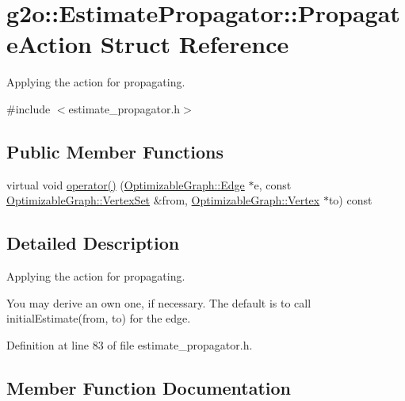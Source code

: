 \hypertarget{structg2o_1_1EstimatePropagator_1_1PropagateAction}{}\section{g2o\+:\+:Estimate\+Propagator\+:\+:Propagate\+Action Struct Reference}
\label{structg2o_1_1EstimatePropagator_1_1PropagateAction}


Applying the action for propagating.  




{\ttfamily \#include $<$estimate\+\_\+propagator.\+h$>$}

\subsection*{Public Member Functions}
\begin{DoxyCompactItemize}
\item 
virtual void \hyperlink{structg2o_1_1EstimatePropagator_1_1PropagateAction_a308da527eee4428cd15c2d6e2247e6ce}{operator()} (\hyperlink{classg2o_1_1OptimizableGraph_1_1Edge}{Optimizable\+Graph\+::\+Edge} $\ast$e, const \hyperlink{classg2o_1_1HyperGraph_a703938cdb4bb636860eed55a2489d70c}{Optimizable\+Graph\+::\+Vertex\+Set} \&from, \hyperlink{classg2o_1_1OptimizableGraph_1_1Vertex}{Optimizable\+Graph\+::\+Vertex} $\ast$to) const 
\end{DoxyCompactItemize}


\subsection{Detailed Description}
Applying the action for propagating. 

You may derive an own one, if necessary. The default is to call initial\+Estimate(from, to) for the edge. 

Definition at line 83 of file estimate\+\_\+propagator.\+h.



\subsection{Member Function Documentation}
